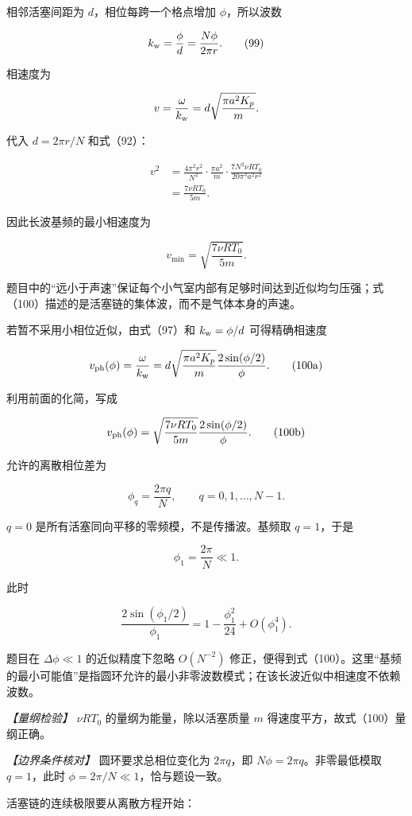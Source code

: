 \documentclass[12pt,a4paper,UTF8]{ctexart}
\begin{document}
相邻活塞间距为 \(d\)，相位每跨一个格点增加 \(\phi\)，所以波数

\[k_{\rm w}=\frac\phi d=\frac{N\phi}{2\pi r}. \tag{99}\]

相速度为

\[v=\frac\omega{k_{\rm w}}
=d\sqrt{\frac{\pi a^2K_p}{m}}.\]

代入 \(d=2\pi r/N\) 和式（92）：

\[\begin{aligned}
v^2
&=\frac{4\pi^2r^2}{N^2}
\cdot\frac{\pi a^2}{m}
\cdot\frac{7N^2\nu RT_0}{20\pi^3a^2r^2}\\
&=\frac{7\nu RT_0}{5m}.
\end{aligned}\]

因此长波基频的最小相速度为

\[\boxed{v_{\min}=\sqrt{\frac{7\nu RT_0}{5m}}}. \tag{100}\]

题目中的``远小于声速''保证每个小气室内部有足够时间达到近似均匀压强；式（100）描述的是活塞链的集体波，而不是气体本身的声速。

若暂不采用小相位近似，由式（97）和 \(k_{\rm w}=\phi/d\) 可得精确相速度

\[v_{\rm ph}(\phi)
=\frac{\omega}{k_{\rm w}}
=d\sqrt{\frac{\pi a^2K_p}{m}}
\frac{2\sin(\phi/2)}{\phi}. \tag{100a}\]

利用前面的化简，写成

\[v_{\rm ph}(\phi)
=\sqrt{\frac{7\nu RT_0}{5m}}
\frac{2\sin(\phi/2)}{\phi}. \tag{100b}\]

允许的离散相位差为

\[\phi_q=\frac{2\pi q}{N},\qquad q=0,1,\ldots,N-1.\]

\(q=0\) 是所有活塞同向平移的零频模，不是传播波。基频取 \(q=1\)，于是

\[\phi_1=\frac{2\pi}{N}\ll1.\]

此时

\[\frac{2\sin(\phi_1/2)}{\phi_1}
=1-\frac{\phi_1^2}{24}+O(\phi_1^4).\]

题目在 \(\Delta\phi\ll1\) 的近似精度下忽略 \(O(N^{-2})\)
修正，便得到式（100）。这里``基频的最小可能值''是指圆环允许的最小非零波数模式；在该长波近似中相速度不依赖波数。

\emph{【量纲检验】} \(\nu RT_0\) 的量纲为能量，除以活塞质量 \(m\)
得速度平方，故式（100）量纲正确。

\emph{【边界条件核对】} 圆环要求总相位变化为 \(2\pi q\)，即
\(N\phi=2\pi q\)。非零最低模取 \(q=1\)，此时
\(\phi=2\pi/N\ll1\)，恰与题设一致。

活塞链的连续极限要从离散方程开始：
\end{document}
